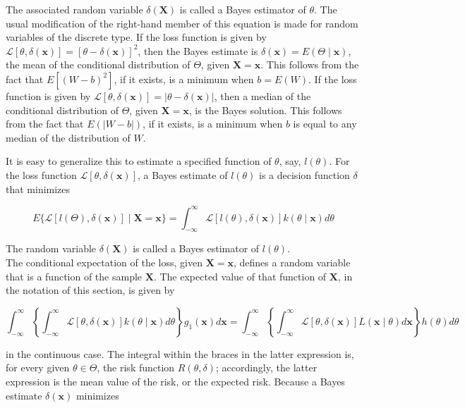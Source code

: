 The associated random variable $\delta(\mathbf{X})$ is called a Bayes estimator of $\theta$. The usual modification of the right-hand member of this equation is made for random variables of the discrete type. If the loss function is given by $\mathcal{L}[\theta, \delta(\mathbf{x})]=[\theta-\delta(\mathbf{x})]^{2}$, then the Bayes estimate is $\delta(\mathbf{x})=E(\Theta \mid \mathbf{x})$, the mean of the conditional distribution of $\Theta$, given $\mathbf{X}=\mathbf{x}$. This follows from the fact that $E\left[(W-b)^{2}\right]$, if it exists, is a minimum when $b=E(W)$. If the loss function is given by $\mathcal{L}[\theta, \delta(\mathbf{x})]=|\theta-\delta(\mathbf{x})|$, then a median of the conditional distribution of $\Theta$, given $\mathbf{X}=\mathbf{x}$, is the Bayes solution. This follows from the fact that $E(|W-b|)$, if it exists, is a minimum when $b$ is equal to any median of the distribution of $W$.

It is easy to generalize this to estimate a specified function of $\theta$, say, $l(\theta)$. For the loss function $\mathcal{L}[\theta, \delta(\mathbf{x})]$, a Bayes estimate of $l(\theta)$ is a decision function $\delta$ that minimizes

$$
E\{\mathcal{L}[l(\Theta), \delta(\mathbf{x})] \mid \mathbf{X}=\mathbf{x}\}=\int_{-\infty}^{\infty} \mathcal{L}[l(\theta), \delta(\mathbf{x})] k(\theta \mid \mathbf{x}) d \theta
$$

The random variable $\delta(\mathbf{X})$ is called a Bayes estimator of $l(\theta)$.\\
The conditional expectation of the loss, given $\mathbf{X}=\mathbf{x}$, defines a random variable that is a function of the sample $\mathbf{X}$. The expected value of that function of $\mathbf{X}$, in the notation of this section, is given by

$$
\int_{-\infty}^{\infty}\left\{\int_{-\infty}^{\infty} \mathcal{L}[\theta, \delta(\mathbf{x})] k(\theta \mid \mathbf{x}) d \theta\right\} g_{1}(\mathbf{x}) d \mathbf{x}=\int_{-\infty}^{\infty}\left\{\int_{-\infty}^{\infty} \mathcal{L}[\theta, \delta(\mathbf{x})] L(\mathbf{x} \mid \theta) d \mathbf{x}\right\} h(\theta) d \theta
$$

in the continuous case. The integral within the braces in the latter expression is, for every given $\theta \in \Theta$, the risk function $R(\theta, \delta)$; accordingly, the latter expression is the mean value of the risk, or the expected risk. Because a Bayes estimate $\delta(\mathbf{x})$ minimizes

